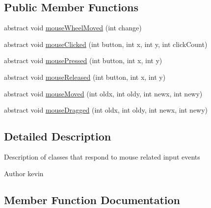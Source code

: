 \subsection*{Public Member Functions}
\begin{DoxyCompactItemize}
\item 
abstract void \mbox{\hyperlink{interfaceorg_1_1newdawn_1_1slick_1_1_mouse_listener_ad7e49c969e1f0315ecdf238f715953d1}{mouse\+Wheel\+Moved}} (int change)
\item 
abstract void \mbox{\hyperlink{interfaceorg_1_1newdawn_1_1slick_1_1_mouse_listener_a3e42b74c252ecdc7418b0ee8bcae5510}{mouse\+Clicked}} (int button, int x, int y, int click\+Count)
\item 
abstract void \mbox{\hyperlink{interfaceorg_1_1newdawn_1_1slick_1_1_mouse_listener_aeca4c21a38aa31c408f3daf6f86c0925}{mouse\+Pressed}} (int button, int x, int y)
\item 
abstract void \mbox{\hyperlink{interfaceorg_1_1newdawn_1_1slick_1_1_mouse_listener_a8d1606869f610664f9299565067d5571}{mouse\+Released}} (int button, int x, int y)
\item 
abstract void \mbox{\hyperlink{interfaceorg_1_1newdawn_1_1slick_1_1_mouse_listener_ad41216afc84f2c8d38f91e8b2d46bed9}{mouse\+Moved}} (int oldx, int oldy, int newx, int newy)
\item 
abstract void \mbox{\hyperlink{interfaceorg_1_1newdawn_1_1slick_1_1_mouse_listener_a65022dd6acb492caa47dfd806b207139}{mouse\+Dragged}} (int oldx, int oldy, int newx, int newy)
\end{DoxyCompactItemize}


\subsection{Detailed Description}
Description of classes that respond to mouse related input events

\begin{DoxyAuthor}{Author}
kevin 
\end{DoxyAuthor}


\subsection{Member Function Documentation}
\mbox{\label{interfaceorg_1_1newdawn_1_1slick_1_1_mouse_listener_a3e42b74c252ecdc7418b0ee8bcae5510}} 
